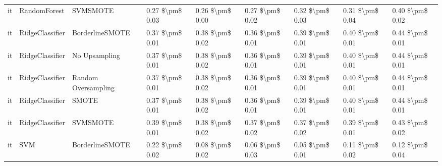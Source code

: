 \begin{tabular}{lllllllll}
      it &                    RandomForest &                      SVMSMOTE & 0.27 \$\textbackslash pm\$ 0.03 &           0.26 \$\textbackslash pm\$ 0.00 &       0.27 \$\textbackslash pm\$ 0.02 &        0.32 \$\textbackslash pm\$ 0.03 &                         0.31 \$\textbackslash pm\$ 0.04 &     0.40 \$\textbackslash pm\$ 0.02 \\
      it &                 RidgeClassifier &               BorderlineSMOTE & 0.37 \$\textbackslash pm\$ 0.01 &           0.38 \$\textbackslash pm\$ 0.02 &       0.36 \$\textbackslash pm\$ 0.01 &        0.39 \$\textbackslash pm\$ 0.01 &                         0.40 \$\textbackslash pm\$ 0.01 &     0.44 \$\textbackslash pm\$ 0.01 \\
      it &                 RidgeClassifier &                 No Upsampling & 0.37 \$\textbackslash pm\$ 0.01 &           0.38 \$\textbackslash pm\$ 0.02 &       0.36 \$\textbackslash pm\$ 0.01 &        0.39 \$\textbackslash pm\$ 0.01 &                         0.40 \$\textbackslash pm\$ 0.01 &     0.44 \$\textbackslash pm\$ 0.01 \\
      it &                 RidgeClassifier &           Random Oversampling & 0.37 \$\textbackslash pm\$ 0.01 &           0.38 \$\textbackslash pm\$ 0.02 &       0.36 \$\textbackslash pm\$ 0.01 &        0.39 \$\textbackslash pm\$ 0.01 &                         0.40 \$\textbackslash pm\$ 0.01 &     0.44 \$\textbackslash pm\$ 0.01 \\
      it &                 RidgeClassifier &                         SMOTE & 0.37 \$\textbackslash pm\$ 0.01 &           0.38 \$\textbackslash pm\$ 0.02 &       0.36 \$\textbackslash pm\$ 0.01 &        0.39 \$\textbackslash pm\$ 0.01 &                         0.40 \$\textbackslash pm\$ 0.01 &     0.44 \$\textbackslash pm\$ 0.01 \\
      it &                 RidgeClassifier &                      SVMSMOTE & 0.39 \$\textbackslash pm\$ 0.01 &           0.38 \$\textbackslash pm\$ 0.02 &       0.37 \$\textbackslash pm\$ 0.02 &        0.37 \$\textbackslash pm\$ 0.02 &                         0.39 \$\textbackslash pm\$ 0.01 &     0.43 \$\textbackslash pm\$ 0.02 \\
      it &                             SVM &               BorderlineSMOTE & 0.22 \$\textbackslash pm\$ 0.02 &           0.08 \$\textbackslash pm\$ 0.02 &       0.06 \$\textbackslash pm\$ 0.03 &        0.05 \$\textbackslash pm\$ 0.01 &                         0.11 \$\textbackslash pm\$ 0.02 &     0.12 \$\textbackslash pm\$ 0.04 \\

\end{tabular}

